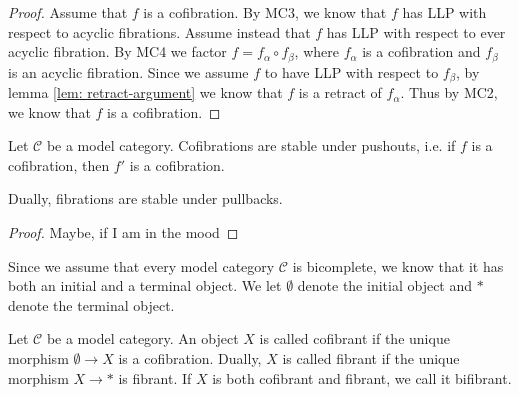 \documentclass[../thesis.tex]{subfiles}
\begin{document}
            \begin{proof}
            Assume that $f$ is a cofibration. By MC3, we know that $f$ has LLP with respect to acyclic fibrations. Assume instead that $f$ has LLP with respect to ever acyclic fibration. By MC4 we factor $f = f_\alpha\circ f_\beta$, where $f_\alpha$ is a cofibration and $f_\beta$ is an acyclic fibration. Since we assume $f$ to have LLP with respect to $f_\beta$, by lemma \ref{lem: retract-argument} we know that $f$ is a retract of $f_\alpha$. Thus by MC2, we know that $f$ is a cofibration. 
            \end{proof}

            \begin{corollary}\label{cor: stable-cofib-base-change}
                Let $\mathcal{C}$ be a model category. Cofibrations are stable under pushouts, i.e. if $f$ is a cofibration, then $f'$ is a cofibration.
                \begin{center}
                \end{center}
                Dually, fibrations are stable under pullbacks.
            \end{corollary}

            \begin{proof}
                Maybe, if I am in the mood   
            \end{proof}

            Since we assume that every model category $\mathcal{C}$ is bicomplete, we know that it has both an initial and a terminal object. We let $\emptyset$ denote the initial object and $*$ denote the terminal object. 

            \begin{definition}
                Let $\mathcal{C}$ be a model category. An object $X$ is called cofibrant if the unique morphism $\emptyset \rightarrow X$ is a cofibration. Dually, $X$ is called fibrant if the unique morphism $X \rightarrow *$ is fibrant. If $X$ is both cofibrant and fibrant, we call it bifibrant.
            \end{definition}
\end{document}
